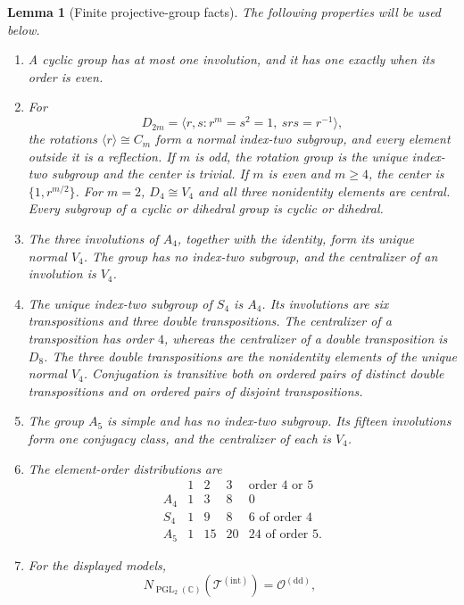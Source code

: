 \documentclass[11pt,letterpaper,onecolumn]{article}
\theoremstyle{plain}
\newtheorem{lemma}[lemma]{Lemma}
\theoremstyle{definition}
\theoremstyle{remark}
\newcommand{\TetInt}{{\mathcal T^{(\mathrm{int})}}}
\newcommand{\OctDD}{{\mathcal O^{(\mathrm{dd})}}}
\newcommand{\PGL}{\operatorname{PGL}}
\begin{document}
\begin{lemma}[Finite projective-group facts]
\label{lem:finite-pgl2-facts}
The following properties will be used below.
\begin{enumerate}
\item A cyclic group has at most one involution, and it has one exactly when
      its order is even.
\item For
      \[
        D_{2m}=\langle r,s:r^m=s^2=1,\ srs=r^{-1}\rangle,
      \]
      the rotations \(\langle r\rangle\cong C_m\) form a normal index-two
      subgroup, and every element outside it is a reflection.  If \(m\) is
      odd, the rotation group is the unique index-two subgroup and the
      center is trivial.  If \(m\) is even and \(m\ge4\), the center is
      \(\{1,r^{m/2}\}\). For \(m=2\), \(D_4\cong V_4\) and all three
      nonidentity elements are central.  Every subgroup of a cyclic or
      dihedral group is cyclic or dihedral.
\item The three involutions of \(A_4\), together with the identity, form
      its unique normal \(V_4\).  The group has no index-two subgroup, and
      the centralizer of an involution is \(V_4\).
\item The unique index-two subgroup of \(S_4\) is \(A_4\).  Its
      involutions are six transpositions and three double transpositions.
      The centralizer of a transposition has order \(4\), whereas the
      centralizer of a double transposition is \(D_8\).  The three double
      transpositions are the nonidentity elements of the unique normal
      \(V_4\).  Conjugation is transitive both on ordered pairs of distinct
      double transpositions and on ordered pairs of disjoint transpositions.
\item The group \(A_5\) is simple and has no index-two subgroup.  Its
      fifteen involutions form one conjugacy class, and the centralizer of
      each is \(V_4\).
\item The element-order distributions are
      \[
      \begin{array}{c|rrrr}
          &1&2&3&\text{order }4\text{ or }5\\ \hline
        A_4&1&3&8&0\\
        S_4&1&9&8&6\text{ of order }4\\
        A_5&1&15&20&24\text{ of order }5.
      \end{array}
      \]
\item For the displayed models,
      \[
        N_{\PGL_2(\mathbb C)}(\TetInt)=\OctDD,
        \qquad
\]
\end{enumerate}
\end{lemma}
\end{document}
